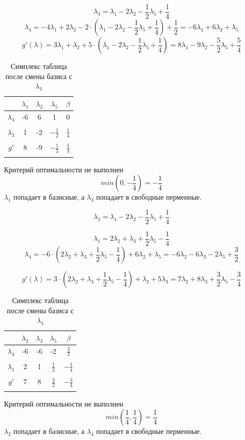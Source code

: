 \documentclass{article}
\begin{document}
\[\lambda_3 = \lambda_1 - 2 \lambda_2 - \frac{1}{2}\lambda_5 +\frac{1}{4} \]
\[\lambda_4 = -4\lambda_1 +2\lambda_2-2\cdot (\lambda_1 - 2 \lambda_2 - \frac{1}{2}\lambda_5 +\frac{1}{4}) + \frac{1}{2} = -6\lambda_1 +6\lambda_2+\lambda_5\]
\[g'(\lambda) = 3\lambda_1 + \lambda_2 + 5\cdot(\lambda_1 - 2 \lambda_2 - \frac{1}{2}\lambda_5 +\frac{1}{4}) =8\lambda_1 - 9\lambda_2-\frac{5}{2}\lambda_5+\frac{5}{4}\]

\begin{table}[H]
    \centering
    \caption{Симплекс таблица после смены базиса с $\lambda_3$}
    \begin{tabular}{|c|c|c|c|c|}
    \hline
    &$\lambda_1$&$\lambda_2$&$\lambda_5$&$\beta$\\\hline
    $\lambda_4$&-6&6&1&0\\
    &&&&\\\hline
    $\lambda_3$&1&-2&$-\frac{1}{2}$&$\frac{1}{4}$\\
    &&&&\\\hline
    $g'$&8&-9&$-\frac{5}{2}$&$\frac{5}{4}$\\
    &&&&\\\hline
    \end{tabular}
\end{table}
Критерий оптимальности не выполнен 
\[min(0, -\frac{1}{4}) = -\frac{1}{4}\]
$\lambda_1$ попадает в базисные, а $\lambda_3$ попадает в свободные перменные.

\[\lambda_3 = \lambda_1 - 2 \lambda_2 - \frac{1}{2}\lambda_5 +\frac{1}{4} \]

\[\lambda_1 = 2\lambda_2 + \lambda_3 +\frac{1}{2}\lambda_5 -\frac{1}{4}\]
\[\lambda_4 = -6\cdot(2\lambda_2 + \lambda_3 +\frac{1}{2}\lambda_5 -\frac{1}{4}) +6\lambda_2+\lambda_5 = -6\lambda_2-6\lambda_3-2\lambda_5 +\frac{3}{2}\]

\[g'(\lambda) = 3\cdot (2\lambda_2 + \lambda_3 +\frac{1}{2}\lambda_5 -\frac{1}{4}) + \lambda_2 + 5\lambda_3 = 7\lambda_2 +8\lambda_3 +\frac{3}{2}\lambda_5 - \frac{3}{4}\]

\begin{table}[H]
    \centering
    \caption{Симплекс таблица после смены базиса с $\lambda_1$}
    \begin{tabular}{|c|c|c|c|c|}
    \hline
    &$\lambda_2$&$\lambda_3$&$\lambda_5$&$\beta$\\\hline
    $\lambda_4$&-6&-6&-2&$\frac{3}{2}$\\
    &&&&\\\hline
    $\lambda_1$&2&1&$\frac{1}{2}$&$-\frac{1}{4}$\\
    &&&&\\\hline
    $g'$&7&8&$\frac{3}{2}$&$-\frac{3}{4}$\\
    &&&&\\\hline
    \end{tabular}
\end{table}
Критерий оптимальности не выполнен 
\[min(\frac{1}{4}, \frac{1}{4}) = \frac{1}{4}\]
$\lambda_2$ попадает в базисные, а $\lambda_4$ попадает в свободные перменные.
\end{document}
